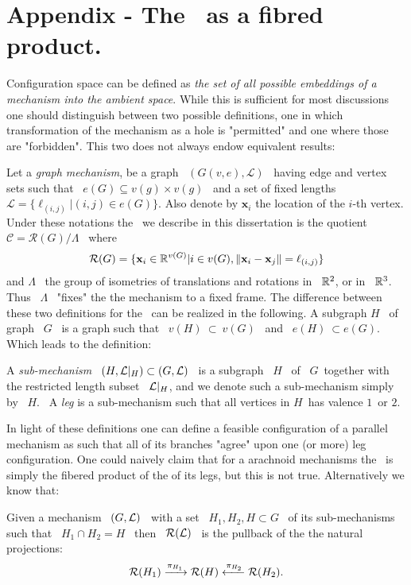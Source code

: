 \chapter{Appendix - The \cspace \ as a fibred product.}
\label{appendix}

Configuration space can be defined as \emph{the set of all
possible embeddings of a mechanism into the ambient space}. While
this is sufficient for most discussions one should distinguish
between two possible definitions, one in which transformation of
the mechanism as a hole is "permitted" and one where those are
"forbidden". This two does not always endow equivalent results:

Let a \emph{graph mechanism}, be a graph \ $(G(v,e),\mathcal{L})$
\ having edge and vertex sets such that \ $e(G) \subseteq
v(g)\times v(g)$ \ and a set of fixed lengths
$\mathcal{L}=\{\ell_{(i,j)}|(i,j)\in e(G)\}$. Also denote by
$\textbf{x}_i$ the location of the $i$-th vertex. Under these
notations the \cspace \ we describe in this dissertation is the
quotient \ $\mathcal{C}=\mathcal{R}(G)/\Lambda$ \ where
%
$$
\mathcal{R}(G)=\{\textbf{x}_i \in {\mathbb R}^{v(G)}|i\in v(G),
\|\textbf{x}_i-\textbf{x}_j\|=\ell_{(i,j)} \}
$$
%
and $\Lambda$ \ the group of isometries of translations and
rotations in \ ${\mathbb R}^{2}$, or in \ ${\mathbb R}^{3}$. Thus \ $\Lambda$ \
"fixes" the the mechanism to a fixed frame. The difference between
these two definitions for the \cspace \ can be realized in the
following. A subgraph $H$ \ of graph \ $G$ \ is a graph such that
\ $v(H) \ \subset \ v(G)$ \ and \ $e(H) \ \subset e(G)$. Which
leads to the definition:
\begin{defn}
A \emph{sub-mechanism} \ $(H,\mathcal{L}|_{H})\subset (G,\mathcal{L})$ \ is
a subgraph \ $H$ \ of \ $G$\ together with the restricted length
subset \ $\mathcal{L}|_{H}$, and we denote such a sub-mechanism simply by \
$H$. \ A \emph{leg} is a sub-mechanism such that all vertices in
$H$\ has valence $1$\ or $2$.
\end{defn}

In light of these definitions one can define a feasible
configuration of a parallel mechanism as such that all of its
branches "agree" upon one (or more) leg configuration. One could
naively claim that for a arachnoid mechanisms the \cspace \ is
simply the fibered product of the \cspace of its legs, but this is
not true. Alternatively we know that:
\begin{thm}
Given a mechanism \ $(G,\mathcal{L})$ \ with a set \ $H_{1},H_{2},H \subset
G$ \ of its sub-mechanisms such that \ $H_{1}\cap H_{2}=H$ \ then
\ $\mathcal{R}(\mathcal{L})$ \ is the pullback of the the natural projections:
%
$$
\mathcal{R}(H_{1}) \xrightarrow{\pi_{H_{1}}} \mathcal{R}(H) \xleftarrow{\pi_{H_{2}}}
\mathcal{R}(H_{2}).
$$
\end{thm}

